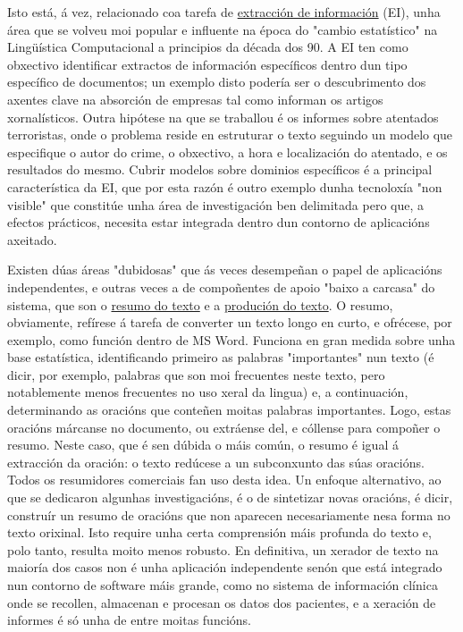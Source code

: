 \begin{multicols}{2}

Isto está, á vez, relacionado coa tarefa de \uline{extracción de información} (EI), unha área que se volveu moi popular e influente na época do "cambio estatístico" na Lingüística Computacional a principios da década dos 90. A EI ten como obxectivo identificar extractos de información específicos dentro dun tipo específico de documentos; un exemplo disto podería ser o descubrimento dos axentes clave na absorción de empresas tal como informan os artigos xornalísticos. Outra hipótese na que se traballou é os informes sobre atentados terroristas, onde o problema reside en estruturar o texto seguindo un modelo que especifique o autor do crime, o obxectivo, a hora e localización do atentado, e os resultados do mesmo. Cubrir modelos sobre dominios específicos é a principal característica da EI, que por esta razón é outro exemplo dunha tecnoloxía "non visible" que constitúe unha área de investigación ben delimitada pero que, a efectos prácticos, necesita estar integrada dentro dun contorno de aplicacións axeitado. 

Existen dúas áreas "dubidosas" que ás veces desempeñan o papel de aplicacións independentes, e outras veces a de compoñentes de apoio "baixo a carcasa" do sistema, que son o \uline{resumo do texto} e a \uline{produción do texto}. O resumo, obviamente, refírese á tarefa de converter un texto longo en curto, e ofrécese, por exemplo, como función dentro de MS Word. Funciona en gran medida sobre unha base estatística, identificando primeiro as palabras "importantes" nun texto (é dicir, por exemplo, palabras que son moi frecuentes neste texto, pero notablemente menos frecuentes no uso xeral da lingua) e, a continuación, determinando as oracións que conteñen moitas palabras importantes. Logo, estas oracións márcanse no documento, ou extráense del, e cóllense para compoñer o resumo. Neste caso, que é sen dúbida o máis común, o resumo é igual á extracción da oración: o texto redúcese a un subconxunto das súas oracións. Todos os resumidores comerciais fan uso desta idea. Un enfoque alternativo, ao que se dedicaron algunhas investigacións, é o de sintetizar novas oracións, é dicir, construír un resumo de oracións que non aparecen necesariamente nesa forma no texto orixinal. Isto require unha certa comprensión máis profunda do texto e, polo tanto, resulta moito menos robusto. En definitiva, un xerador de texto na maioría dos casos non é unha aplicación independente senón que está integrado nun contorno de software máis grande, como no sistema de información clínica onde se recollen, almacenan e procesan os datos dos pacientes, e a xeración de informes é só unha de entre moitas funcións.


\end{multicols}
